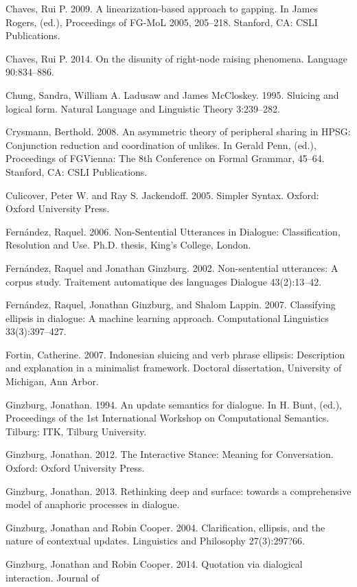 \documentclass[output=paper]{langsci/langscibook}
\begin{document}
\begin{description}
\item Chaves, Rui P. 2009. A linearization-based approach to gapping. In James Rogers, (ed.),
Proceedings of FG-MoL 2005, 205--218. Stanford, CA: CSLI Publications.
\item Chaves, Rui P. 2014. On the disunity of right-node raising phenomena. Language 90:834--886.
\item Chung, Sandra, William A. Ladusaw and James McCloskey. 1995. Sluicing and logical form. Natural Language and Linguistic Theory 3:239--282.
\item Crysmann, Berthold. 2008. An asymmetric theory of peripheral sharing in HPSG:
Conjunction reduction and coordination of unlikes. In Gerald Penn, (ed.), Proceedings of
FGVienna: The 8th Conference on Formal Grammar, 45--64. Stanford, CA: CSLI
Publications.
\item Culicover, Peter W. and Ray S. Jackendoff. 2005. Simpler Syntax. Oxford: Oxford University
Press.
\item Fern\'{a}ndez, Raquel. 2006. Non-Sentential Utterances in Dialogue: Classification, Resolution
and Use. Ph.D. thesis, King's College, London.
\item Fern\'{a}ndez, Raquel and Jonathan Ginzburg. 2002. Non-sentential utterances: A corpus study.
Traitement automatique des languages Dialogue 43(2):13--42.
\item Fern\'{a}ndez, Raquel, Jonathan Ginzburg, and Shalom Lappin. 2007. Classifying ellipsis in
dialogue: A machine learning approach. Computational Linguistics 33(3):397--427.
\item Fortin, Catherine. 2007. Indonesian sluicing and verb phrase ellipsis: Description and
explanation in a minimalist framework. Doctoral dissertation, University of Michigan, Ann
Arbor.
\item Ginzburg, Jonathan. 1994. An update semantics for dialogue. In H. Bunt, (ed.), Proceedings of
the 1st International Workshop on Computational Semantics. Tilburg: ITK, Tilburg
University.
\item Ginzburg, Jonathan. 2012. The Interactive Stance: Meaning for Conversation. Oxford:
Oxford University Press.
\item Ginzburg, Jonathan. 2013. Rethinking deep and surface: towards a comprehensive model of anaphoric processes in
dialogue.
\item Ginzburg, Jonathan and Robin Cooper. 2004. Clarification, ellipsis, and the nature of
contextual updates. Linguistics and Philosophy 27(3):297?66.
\item Ginzburg, Jonathan and Robin Cooper. 2014. Quotation via dialogical interaction. Journal of

\end{description}
\end{document}

